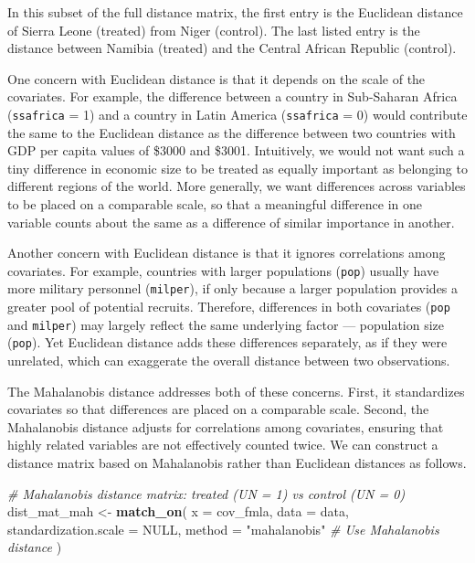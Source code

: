 \documentclass[
  12pt,
  leqno]{article}
\newenvironment{Shaded}{\begin{snugshade}}{\end{snugshade}}
\newcommand{\AttributeTok}[1]{\textcolor[rgb]{0.13,0.29,0.53}{#1}}
\newcommand{\CommentTok}[1]{\textcolor[rgb]{0.56,0.35,0.01}{\textit{#1}}}
\newcommand{\ConstantTok}[1]{\textcolor[rgb]{0.56,0.35,0.01}{#1}}
\newcommand{\FunctionTok}[1]{\textcolor[rgb]{0.13,0.29,0.53}{\textbf{#1}}}
\newcommand{\NormalTok}[1]{#1}
\newcommand{\OtherTok}[1]{\textcolor[rgb]{0.56,0.35,0.01}{#1}}
\newcommand{\StringTok}[1]{\textcolor[rgb]{0.31,0.60,0.02}{#1}}
\begin{document}
\doublespacing

In this subset of the full distance matrix, the first entry is the
Euclidean distance of Sierra Leone (treated) from Niger (control). The
last listed entry is the distance between Namibia (treated) and the
Central African Republic (control).

One concern with Euclidean distance is that it depends on the scale of
the covariates. For example, the difference between a country in
Sub-Saharan Africa (\texttt{ssafrica} = 1) and a country in Latin
America (\texttt{ssafrica} = 0) would contribute the same to the
Euclidean distance as the difference between two countries with GDP per
capita values of \$3000 and \$3001. Intuitively, we would not want such
a tiny difference in economic size to be treated as equally important as
belonging to different regions of the world. More generally, we want
differences across variables to be placed on a comparable scale, so that
a meaningful difference in one variable counts about the same as a
difference of similar importance in another.

Another concern with Euclidean distance is that it ignores correlations
among covariates. For example, countries with larger populations
(\texttt{pop}) usually have more military personnel (\texttt{milper}),
if only because a larger population provides a greater pool of potential
recruits. Therefore, differences in both covariates (\texttt{pop} and
\texttt{milper}) may largely reflect the same underlying factor ---
population size (\texttt{pop}). Yet Euclidean distance adds these
differences separately, as if they were unrelated, which can exaggerate
the overall distance between two observations.

The Mahalanobis distance \citep{mahalanobis1936} addresses both of these
concerns. First, it standardizes covariates so that differences are
placed on a comparable scale. Second, the Mahalanobis distance adjusts
for correlations among covariates, ensuring that highly related
variables are not effectively counted twice. We can construct a distance
matrix based on Mahalanobis rather than Euclidean distances as follows.

\singlespacing

\begin{Shaded}
\begin{Highlighting}[]
\CommentTok{\# Mahalanobis distance matrix: treated (UN = 1) vs control (UN = 0)}
\NormalTok{dist\_mat\_mah }\OtherTok{\textless{}{-}} \FunctionTok{match\_on}\NormalTok{(}
  \AttributeTok{x =}\NormalTok{ cov\_fmla,}
  \AttributeTok{data =}\NormalTok{ data,}
  \AttributeTok{standardization.scale =} \ConstantTok{NULL}\NormalTok{,}
  \AttributeTok{method =} \StringTok{"mahalanobis"} \CommentTok{\# Use Mahalanobis distance}
\NormalTok{)}
\end{Highlighting}
\end{Shaded}
\end{document}
